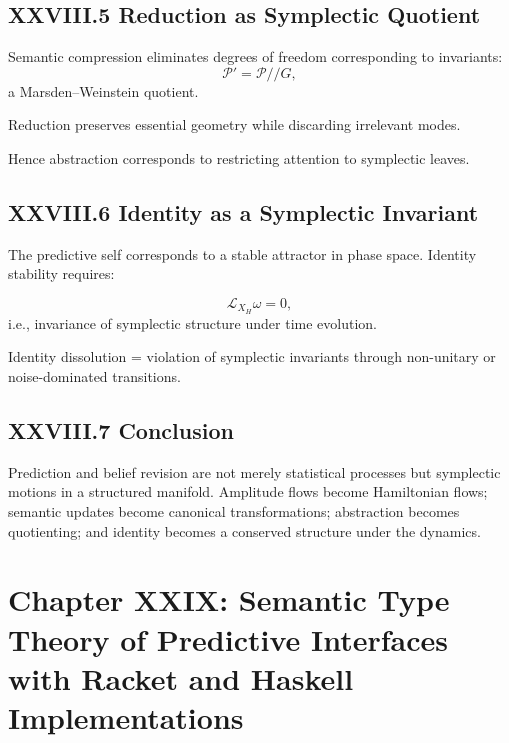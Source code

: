 \documentclass[11pt,letterpaper]{article}
\begin{document}
\subsection{XXVIII.5 Reduction as Symplectic Quotient}

Semantic compression eliminates degrees of freedom corresponding to invariants:
\[
\mathcal{P}' = \mathcal{P} /\!/ G,
\]
a Marsden–Weinstein quotient.

Reduction preserves essential geometry while discarding irrelevant modes.

Hence abstraction corresponds to restricting attention to symplectic leaves.

\subsection{XXVIII.6 Identity as a Symplectic Invariant}

The predictive self corresponds to a stable attractor in phase space.  
Identity stability requires:

\[
\mathcal{L}_{X_H}\omega = 0,
\]
i.e., invariance of symplectic structure under time evolution.

Identity dissolution = violation of symplectic invariants through non-unitary or noise-dominated transitions.

\subsection{XXVIII.7 Conclusion}

Prediction and belief revision are not merely statistical processes but symplectic motions in a structured manifold. Amplitude flows become Hamiltonian flows; semantic updates become canonical transformations; abstraction becomes quotienting; and identity becomes a conserved structure under the dynamics.

\newpage

\section{Chapter XXIX: Semantic Type Theory of Predictive Interfaces  
with Racket and Haskell Implementations}
\end{document}
